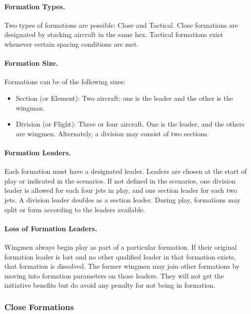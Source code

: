 \paragraph{Formation Types.} Two types of formations are possible: Close and Tactical. Close formations are designated by stacking aircraft in the same hex. Tactical formations exist whenever certain spacing conditions are met.

\paragraph{Formation Size.} Formations can be of the following sizes:

\begin{itemize}
    \item Section (or Element): Two aircraft; one is the leader and the other is the wingman.
    \item Division (or Flight): Three or four aircraft. One is the leader, and the others are wingmen. Alternately, a division may consist of two sections.
\end{itemize}

\paragraph{Formation Leaders.} Each formation must have a designated leader. Leaders are chosen at the start of play or indicated in the scenarios.  If not defined in the scenarios, one division leader is allowed for each four jets in play, and one section leader for each two jets. A division leader doubles as a section leader. During play, formations may split or form according to the leaders available.

\paragraph{Loss of Formation Leaders.} Wingmen always begin play as part of a particular formation. If their original formation leader is lost and no other qualified leader in that formation exists, that formation is dissolved. The former wingmen may join other formations by moving into formation parameters on those leaders. They will not get the initiative benefits but do avoid any penalty for not being in formation.

\subsubsection{Close Formations}

